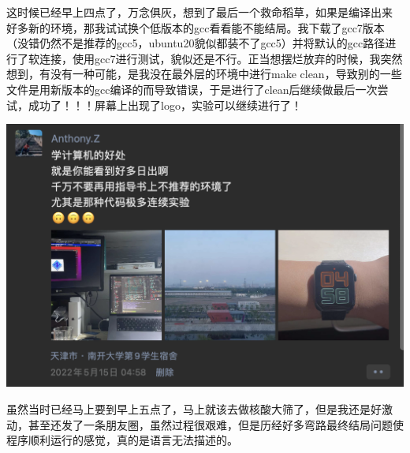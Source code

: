 \documentclass[UTF8,a4paper,10pt]{ctexart}
\begin{document}
这时候已经早上四点了，万念俱灰，想到了最后一个救命稻草，如果是编译出来 好多新的环境，那我试试换个低版本的gcc看看能不能结局。我下载了gcc7版本（没错仍然不是推荐的gcc5，ubuntu20貌似都装不了gcc5）并将默认的gcc路径进行了软连接，使用gcc7进行测试，貌似还是不行。正当想摆烂放弃的时候，我突然想到，有没有一种可能，是我没在最外层的环境中进行make clean，导致别的一些文件是用新版本的gcc编译的而导致错误，于是进行了clean后继续做最后一次尝试，成功了！！！屏幕上出现了logo，实验可以继续进行了！
\begin{center}
  \includegraphics*[scale=0.6]{pic/A}
\end{center}
虽然当时已经马上要到早上五点了，马上就该去做核酸大筛了，但是我还是好激动，甚至还发了一条朋友圈，虽然过程很艰难，但是历经好多弯路最终结局问题使程序顺利运行的感觉，真的是语言无法描述的。
\end{document}
